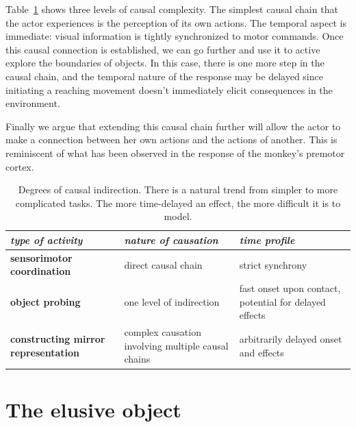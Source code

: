 Table~\ref{tab:causation} shows three levels of causal complexity.
The simplest causal chain that the actor experiences is the
perception of its own actions.  The temporal aspect is immediate:
visual information is tightly synchronized to motor commands.
Once this causal connection is established, we can go further and use
it to active explore the boundaries of objects.  In this case, there
is one more step in the causal chain, and the temporal nature of
the response may be delayed since initiating a reaching movement doesn't
immediately elicit consequences in the environment.  


Finally we argue that extending this causal chain further will allow
the actor to make a connection between her own actions and the actions 
of another. This is reminiscent of what has been observed in the response
of the monkey's premotor cortex. 


\begin{table}[htbp]
\begin{center}
\begin{tabular}{|p{5.2cm}|p{4.5cm}|p{4.5cm}|}
\hline
{\it type of activity} & {\it nature of causation} &  {\it time profile} \\ \hline\hline
{\bf sensorimotor coordination} & direct causal chain & strict synchrony \\ \hline
{\bf object probing} & one level of indirection & fast onset upon contact, potential for delayed effects\\ \hline
{\bf constructing mirror representation} &  complex causation involving multiple causal chains & arbitrarily delayed onset and effects\\ \hline
\end{tabular}
\caption{
\label{tab:causation}
%
Degrees of causal indirection. There is a natural
trend from simpler to more complicated tasks.  The more time-delayed
an effect, the more difficult it is to model.
%
}
\end{center}
\end{table}



\ifverbose 

\section{The elusive object}

\label{sect:introduction}

